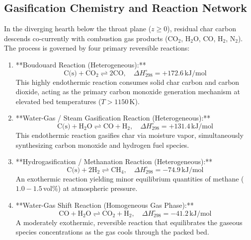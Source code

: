 \documentclass[11pt,a4paper]{article}
\begin{document}
\subsection{Gasification Chemistry and Reaction Network}
In the diverging hearth below the throat plane ($z \ge 0$), residual char carbon descends co-currently with combustion gas products (CO$_2$, H$_2$O, CO, H$_2$, N$_2$). The process is governed by four primary reversible reactions:

\begin{enumerate}[leftmargin=2.0em]
    \item **Boudouard Reaction (Heterogeneous):**
    \begin{equation}
        \text{C(s)} + \text{CO}_2 \rightleftharpoons 2\text{CO}, \quad \Delta H^\circ_{298} = +172.6\,\text{kJ/mol}
        \label{eq:boudouard}
    \end{equation}
    This highly endothermic reaction consumes solid char carbon and carbon dioxide, acting as the primary carbon monoxide generation mechanism at elevated bed temperatures ($T > 1150$\,K).

    \item **Water-Gas / Steam Gasification Reaction (Heterogeneous):**
    \begin{equation}
        \text{C(s)} + \text{H}_2\text{O} \rightleftharpoons \text{CO} + \text{H}_2, \quad \Delta H^\circ_{298} = +131.4\,\text{kJ/mol}
        \label{eq:watergas}
    \end{equation}
    This endothermic reaction gasifies char via moisture vapor, simultaneously synthesizing carbon monoxide and hydrogen fuel species.

    \item **Hydrogasification / Methanation Reaction (Heterogeneous):**
    \begin{equation}
        \text{C(s)} + 2\text{H}_2 \rightleftharpoons \text{CH}_4, \quad \Delta H^\circ_{298} = -74.9\,\text{kJ/mol}
        \label{eq:hydrogas}
    \end{equation}
    An exothermic reaction yielding minor equilibrium quantities of methane ($1.0 - 1.5$\,vol\%) at atmospheric pressure.

    \item **Water-Gas Shift Reaction (Homogeneous Gas Phase):**
    \begin{equation}
        \text{CO} + \text{H}_2\text{O} \rightleftharpoons \text{CO}_2 + \text{H}_2, \quad \Delta H^\circ_{298} = -41.2\,\text{kJ/mol}
        \label{eq:wgshift}
    \end{equation}
    A moderately exothermic, reversible reaction that equilibrates the gaseous species concentrations as the gas cools through the packed bed.
\end{enumerate}
\end{document}
